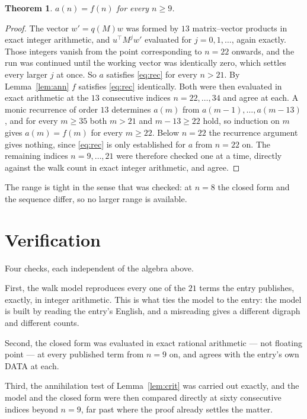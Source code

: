 \documentclass[11pt,a4paper]{article}
\theoremstyle{plain}
\newtheorem{theorem}{Theorem}
\theoremstyle{definition}
\begin{document}
\begin{theorem}
$a(n)=f(n)$ for every $n\ge9$.
\end{theorem}

\begin{proof}
The vector $w'=q(M)w$ was formed by $13$ matrix--vector products in exact integer
arithmetic, and $u^{\!\top}M^{j}w'$ evaluated for $j=0,1,\dots$, again exactly. Those integers
vanish from the point corresponding to $n=22$ onwards, and the run was continued until the
working vector was identically zero, which settles every larger $j$ at once. So $a$ satisfies
\eqref{eq:rec} for every $n>21$. By Lemma~\ref{lem:ann} $f$ satisfies \eqref{eq:rec}
identically. Both were then evaluated in exact arithmetic at the $13$ consecutive indices
$n=22,\dots,34$ and agree at each. A monic recurrence of order $13$
determines $a(m)$ from $a(m-1),\dots,a(m-13)$, and for every $m\ge35$ both
$m>21$ and $m-13\ge22$ hold, so induction on $m$ gives $a(m)=f(m)$ for every
$m\ge22$.
Below $n=22$ the recurrence argument gives nothing, since \eqref{eq:rec} is only
established for $a$ from $n=22$ on. The remaining indices $n=9,\dots,21$ were
therefore checked one at a time, directly against the walk count in exact integer arithmetic,
and agree.
\end{proof}

The range is tight in the sense that was checked: at $n=8$ the closed form and the sequence differ, so no larger range is available.

\section{Verification}

Four checks, each independent of the algebra above.

First, the walk model reproduces every one of the $21$ terms the entry publishes,
exactly, in integer arithmetic. This is what ties the model to the entry: the model is built
by reading the entry's English, and a misreading gives a different digraph and different
counts.

Second, the closed form was evaluated in exact rational arithmetic --- not floating point ---
at every published term from $n=9$ on, and agrees with the entry's own DATA at each.

Third, the annihilation test of Lemma~\ref{lem:crit} was carried out exactly, and the model
and the closed form were then compared directly at sixty consecutive indices beyond
$n=9$, far past where the proof already settles the matter.
\end{document}
